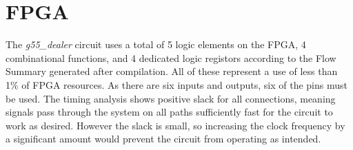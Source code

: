 \documentclass[12pt]{article}
\begin{document}
\section{FPGA}
The \textit{g55\_dealer} circuit uses a total of 5 logic elements on the FPGA, 4 combinational functions, and 4 dedicated logic registors according to the Flow Summary generated after compilation. All of these represent a use of less than 1\% of FPGA resources. As there are six inputs and outputs, six of the pins must be used. The timing analysis shows positive slack for all connections, meaning signals pass through the system on all paths sufficiently fast for the circuit to work as desired. However the slack is small, so increasing the clock frequency by a significant amount would prevent the circuit from operating as intended.
\end{document}
